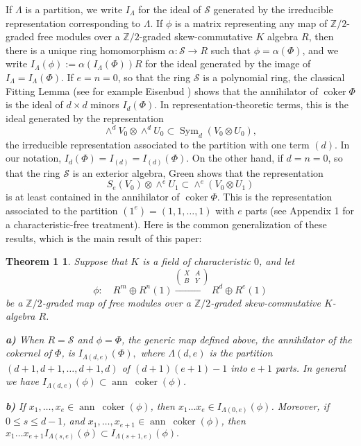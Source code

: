 \documentclass{tran-l}
\theoremstyle{plain}
\newtheorem*{theorem1}{Theorem 1}
\theoremstyle{remark}
\theoremstyle{definition}
\newcommand{\Sym}{\operatorname {Sym}}
\newcommand{\myS}{{\mathcal S}}
\newcommand{\coker}{\operatorname{coker}}
\newcommand{\ann}{\operatorname{ann}}
\newcommand{\ZZ}{\mathbb {Z}}
\begin{document}
If $\Lambda $ is a partition, we write $I_{\Lambda }$ for the
ideal of $\myS $ generated by the irreducible representation
corresponding to $\Lambda $. If $\phi $ is a matrix representing any map
of $\ZZ /2$-graded free modules over a $\ZZ /2$-graded skew-commutative
$K$ algebra $R$, then there is a unique ring homomorphism $\alpha :
\myS \to R$ such that $\phi = \alpha (\Phi )$, and we write
$I_{\Lambda }(\phi ):=\alpha (I_{\Lambda }(\Phi ))R$ for the ideal generated by
the image of $I_{\Lambda }=I_{\Lambda }(\Phi )$.
If $e=n=0$, so that the ring $\myS $ is a polynomial ring,  
the classical Fitting
Lemma (see for example Eisenbud \cite[Prop.~20.7]{Eis}) 
shows that the annihilator of 
$\coker \Phi $ is the ideal of $d\times d$
minors $I_{d}(\Phi )$. In representation-theoretic terms,
this is the ideal 
generated by the representation 
\begin{equation*}\wedge ^{d}V_{0}\otimes \wedge ^{d}U_{0}\subset \Sym _{d}(V_{0}\otimes U_{0}),
\end{equation*}
the irreducible representation associated to the partition with
one term $(d)$. In our notation, 
$I_{d}(\Phi )= I_{(d)} = I_{(d)}(\Phi )$. On the other
hand, if $d=n=0$, so that the ring $\myS $ is an exterior algebra,
Green \cite[Proposition 1.3]{Gre} shows that the
representation 
\begin{equation*}S_{e}(V_{0})\otimes \wedge ^{e}U_{1} \subset \wedge ^{e}(V_{0}\otimes U_{1})
\end{equation*} 
is at least contained in the annihilator of $\coker \Phi $.
This is the representation associated to the partition
$(1^{e})=(1,1,\dots ,1)$ with $e$ parts (see Appendix 1 for a
characteristic-free treatment).
Here is the common
generalization of these results,
which is the main result of this paper:

\begin{theorem1} Suppose that $K$ is a field of characteristic $0$,
and let  
\begin{equation*}\phi :\quad R^{m}\oplus R^{n}(1) 
\overset{\left(\begin{smallmatrix}X&A\\B&Y\end{smallmatrix}\right)}{\longrightarrow}
R^{d}\oplus R^{e}(1)
\end{equation*}
be a $\ZZ /2$-graded map of free modules over a 
$\ZZ /2$-graded skew-commutative
$K$-algebra $R$.

{\bf a) } When $R=\myS $ and $\phi =\Phi $, the generic map
defined above,
the annihilator of the cokernel of $\Phi $, is
$I_{\Lambda (d,e)}(\Phi ),
$
where
$\Lambda (d,e)$ is the partition $(d+1,d+1,\dots ,d+1, d)$ of $(d+1)(e+1)-1$
into $e+1$ parts. In general we have
$I_{\Lambda (d,e)}(\phi )\subset \ann \ \coker (\phi )$.

{\bf b)} 
If $x_{1} ,\ldots ,x_{e} \in \ann \ \coker (\phi )$, then
$x_{1}\ldots x_{e}\in I_{\Lambda (0,e)}(\phi )$.
Moreover, if  $0\le s\le d-1$, and 
$x_{1} ,\ldots ,x_{e+1}\in \ann \ \coker (\phi )$, 
then 
$x_{1}\ldots x_{e+1}I_{\Lambda (s,e)}(\phi )\subset I_{\Lambda (s+1,e)}(\phi ).
$
\end{theorem1}
\end{document}
